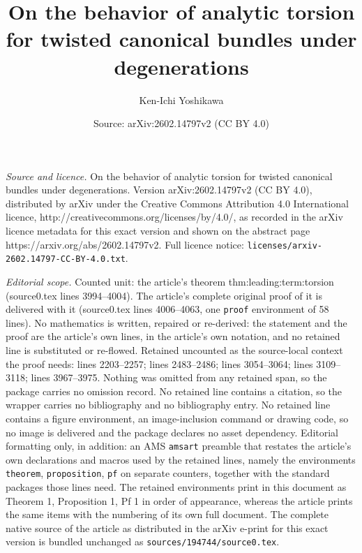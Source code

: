 \documentclass[10pt,a4paper]{amsart}
\title{On the behavior of analytic torsion for twisted canonical bundles under degenerations}
\author{Ken-Ichi Yoshikawa}
\date{Source: arXiv:2602.14797v2 (CC BY 4.0)}
\begin{document}
\maketitle

\noindent\emph{Source and licence.} On the behavior of analytic torsion for twisted canonical bundles under degenerations. Version arXiv:2602.14797v2 (CC BY 4.0), distributed by arXiv under the Creative Commons Attribution 4.0 International licence, http://creativecommons.org/licenses/by/4.0/, as recorded in the arXiv licence metadata for this exact version and shown on the abstract page https://arxiv.org/abs/2602.14797v2. Full licence notice: \texttt{licenses/arxiv-2602.14797-CC-BY-4.0.txt}.\par\smallskip

\noindent\textit{Editorial scope.} Counted unit: the article's theorem thm:leading:term:torsion (source0.tex lines 3994--4004). The article's complete original proof of it is delivered with it (source0.tex lines 4006--4063, one \texttt{proof} environment of 58 lines). No mathematics is written, repaired or re-derived: the statement and the proof are the article's own lines, in the article's own notation, and no retained line is substituted or re-flowed.  Retained uncounted as the source-local context the proof needs: lines 2203--2257; lines 2483--2486; lines 3054--3064; lines 3109--3118; lines 3967--3975.  Nothing was omitted from any retained span, so the package carries no omission record.  No retained line contains a citation, so the wrapper carries no bibliography and no bibliography entry.  No retained line contains a figure environment, an image-inclusion command or drawing code, so no image is delivered and the package declares no asset dependency.  Editorial formatting only, in addition: an AMS \texttt{amsart} preamble that restates the article's own declarations and macros used by the retained lines, namely the environments \texttt{theorem}, \texttt{proposition}, \texttt{pf} on separate counters, together with the standard packages those lines need.  The retained environments print in this document as Theorem 1, Proposition 1, Pf 1 in order of appearance, whereas the article prints the same items with the numbering of its own full document.  The complete native source of the article as distributed in the arXiv e-print for this exact version is bundled unchanged as \texttt{sources/194744/source0.tex}.
\end{document}
